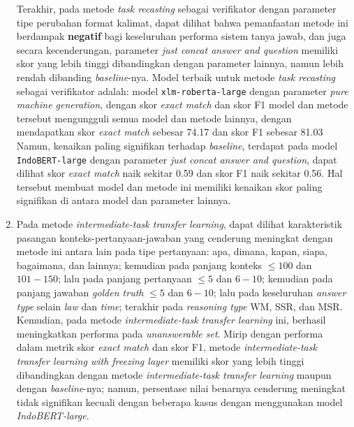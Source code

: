 \begin{enumerate}
 Terakhir, pada metode \emph{task recasting} sebagai verifikator dengan parameter tipe perubahan format kalimat, dapat dilihat bahwa pemanfaatan metode ini berdampak \textbf{negatif} bagi keseluruhan performa sistem tanya jawab, dan juga secara kecenderungan, parameter \emph{just concat answer and question} memiliki skor yang lebih tinggi dibandingkan dengan parameter lainnya, namun lebih rendah dibanding \emph{baseline}-nya. Model terbaik untuk metode \emph{task recasting} sebagai verifikator adalah: model \texttt{xlm-roberta-large} dengan parameter \emph{pure machine generation}, dengan skor \emph{exact match} dan skor F1 model dan metode tersebut mengungguli semua model dan metode lainnya, dengan mendapatkan skor \emph{exact match} sebesar 74.17 dan skor F1 sebesar 81.03 Namun, kenaikan paling signifikan terhadap \emph{baseline}, terdapat pada model \texttt{IndoBERT-large} dengan parameter \emph{just concat answer and question}, dapat dilihat skor \emph{exact match} naik sekitar 0.59 dan skor F1 naik sekitar 0.56. Hal tersebut membuat model dan metode ini memiliki kenaikan skor paling signifikan di antara model dan parameter lainnya.

 \item {}

 Pada metode \emph{intermediate-task transfer learning}, dapat dilihat karakteristik pasangan konteks-pertanyaan-jawaban yang cenderung meningkat dengan metode ini antara lain pada tipe pertanyaan: apa, dimana, kapan, siapa, bagaimana, dan lainnya; kemudian pada panjang konteks $\leq100$ dan $101-150$; lalu pada panjang pertanyaan $\leq5$ dan $6-10$; kemudian pada panjang jawaban \emph{golden truth} $\leq5$ dan $6-10$; lalu pada keseluruhan \emph{answer type} selain \emph{law} dan \emph{time}; terakhir pada \emph{reasoning type} WM, SSR, dan MSR. Kemudian, pada metode \emph{intermediate-task transfer learning} ini, berhasil meningkatkan performa pada \emph{unanswerable set}. Mirip dengan performa dalam metrik skor \emph{exact match} dan skor F1, metode \emph{intermediate-task transfer learning with freezing layer} memiliki skor yang lebih tinggi dibandingkan dengan metode \emph{intermediate-task transfer learning} maupun dengan \emph{baseline}-nya; namun, persentase nilai benarnya cenderung meningkat tidak signifikan kecuali dengan beberapa kasus dengan menggunakan model \emph{IndoBERT-large}. 
 

\end{enumerate}
